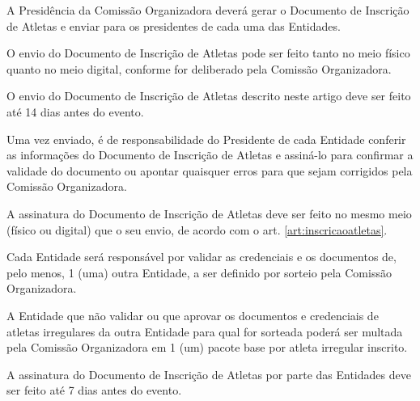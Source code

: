 \begin{article}
    \label{art:inscricaoatletas}
    A Presidência da Comissão Organizadora deverá gerar o Documento de Inscrição de Atletas e enviar para os presidentes de cada uma das Entidades.

	\begin{xparagraph}
	    O envio do Documento de Inscrição de Atletas pode ser feito tanto no meio físico quanto no meio digital, conforme for deliberado pela Comissão Organizadora.
	\end{xparagraph}
	
	\begin{xparagraph}
	    O envio do Documento de Inscrição de Atletas descrito neste artigo deve ser feito até 14 dias antes do evento.
	\end{xparagraph}
\end{article}

\begin{article}
    \label{art:presidentesassinar}
    Uma vez enviado, é de responsabilidade do Presidente de cada Entidade conferir as informações do Documento de Inscrição de Atletas e assiná-lo para confirmar a validade do documento ou apontar quaisquer erros para que sejam corrigidos pela Comissão Organizadora.

	\begin{xparagraph}
	    A assinatura do Documento de Inscrição de Atletas deve ser feito no mesmo meio (físico ou digital) que o seu envio, de acordo com o art. \ref{art:inscricaoatletas}\ulo.
	\end{xparagraph}

	\begin{xparagraph}
        Cada Entidade será responsável por validar as credenciais e os documentos de, pelo menos, 1 (uma) outra Entidade, a ser definido por sorteio pela Comissão Organizadora.
	\end{xparagraph}

	\begin{xparagraph}
        A Entidade que não validar ou que aprovar os documentos e credenciais de atletas irregulares da outra Entidade para qual for sorteada poderá ser multada pela Comissão Organizadora em 1 (um) pacote base por atleta irregular inscrito.
	\end{xparagraph}

	\begin{xparagraph}
	    A assinatura do Documento de Inscrição de Atletas por parte das Entidades deve ser feito até 7 dias antes do evento.
	\end{xparagraph}
\end{article}

